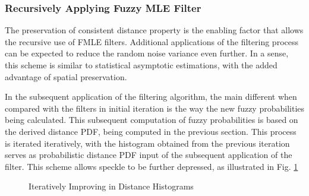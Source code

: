 \subsubsection{Recursively Applying Fuzzy MLE Filter}

The preservation of consistent distance property is the enabling factor that allows the recursive use of FMLE filters.
Additional applications of the filtering process can be expected to reduce the random noise variance even further.
In a sense, this scheme is similar to statistical asymptotic estimations, with the added advantage of spatial preservation.

In the subsequent application of the filtering algorithm, the main different when compared with the filters in initial iteration is the way the new fuzzy probabilities being calculated.
This subsequent computation of fuzzy probabilities is based on the derived distance PDF, being computed in the previous section.
This process is iterated iteratively, with the histogram obtained from the previous iteration serves as probabilistic distance PDF input of the subsequent application of the filter.
This scheme allows speckle to be further depressed, as illustrated in Fig. \ref{fig:plot_incl_distance_pdf_by_iterations}

\begin{figure}[h!]
\centering
\caption{Iteratively Improving in Distance Histograms}
\label{fig:plot_incl_distance_pdf_by_iterations}
\end{figure}

